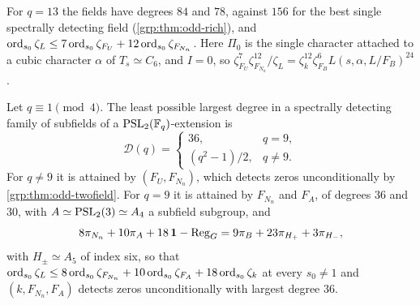 For $q=13$ the fields have degrees $84$ and $78$, against $156$ for the best single
spectrally detecting field (\cref{grp:thm:odd-rich}), and
$\operatorname{ord}_{s_0}\zeta_L\le7\operatorname{ord}_{s_0}\zeta_{F_U}+12\operatorname{ord}_{s_0}\zeta_{F_{N_n}}$. Here $\Pi_0$ is the single
character attached to a cubic character $\alpha$ of $T_s\simeq C_6$, and $I=0$, so
$\zeta_{F_U}^7\zeta_{F_{N_n}}^{12}/\zeta_L=\zeta_k^{12}\zeta_{F_B}^6L(s,\alpha,L/F_B)^{24}$.

\begin{theorem}\label{grp:thm:odd-family}
Let $q\equiv1\pmod4$. The least possible largest degree in a spectrally detecting family of
subfields of a $\operatorname{PSL}_2(\mathbb{F}_q)$-extension is
\[
 \mathcal D(q)=\begin{cases}36,&q=9,\\(q^2-1)/2,&q\ne9.\end{cases}
\]
For $q\ne9$ it is attained by $(F_U,F_{N_n})$, which detects zeros unconditionally by
\cref{grp:thm:odd-twofield}. For $q=9$ it is attained by $F_{N_n}$ and $F_A$, of degrees $36$ and
$30$, with $A\simeq\operatorname{PSL}_2(3)\simeq A_4$ a subfield subgroup, and
\begin{equation}\label{grp:eq:q9}
 8\pi_{N_n}+10\pi_A+18\,\mathbf{1}-\operatorname{Reg}_G=9\pi_B+23\pi_{H_+}+3\pi_{H_-},
\end{equation}
with $H_\pm\simeq A_5$ of index six, so that
$\operatorname{ord}_{s_0}\zeta_L\le8\operatorname{ord}_{s_0}\zeta_{F_{N_n}}+10\operatorname{ord}_{s_0}\zeta_{F_A}+18\operatorname{ord}_{s_0}\zeta_k$ at every
$s_0\ne1$ and $(k,F_{N_n},F_A)$ detects zeros unconditionally with largest degree $36$.
\end{theorem}
